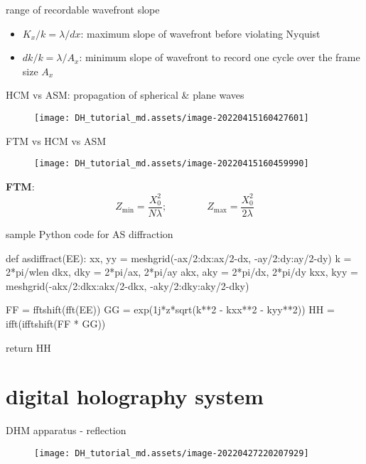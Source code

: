 \documentclass[t, aspectratio=169]{beamer}
\begin{document}
\begin{frame}{range of recordable wavefront slope}
	\begin{itemize}
		\item $K_x/k=\lambda/dx$: maximum slope of wavefront before violating Nyquist
		\item $dk/k = \lambda/A_x$: minimum slope of wavefront to record one cycle over the frame size $A_x$ 
	\end{itemize}
\end{frame}


\begin{frame}{HCM vs ASM: propagation of spherical \& plane waves}
	\begin{figure}
		\texttt{[image: DH\_tutorial\_md.assets/image-20220415160427601]}
	\end{figure}
\end{frame}


\begin{frame}{FTM vs HCM vs ASM}
	\begin{figure}
		\texttt{[image: DH\_tutorial\_md.assets/image-20220415160459990]}
	\end{figure}
	\textbf{FTM}: 
	\[ Z_{\min} = \frac{X_0^2}{N\lambda}; \qquad\qquad Z_{\max} = \frac{X_0^2}{2\lambda} \]
\end{frame}


\begin{frame}[fragile]{sample Python code for AS diffraction}
\begin{semiverbatim}
def asdiffract(EE):    
    xx, yy = meshgrid(-ax/2:dx:ax/2-dx, -ay/2:dy:ay/2-dy)
    k = 2*pi/wlen
    dkx, dky = 2*pi/ax, 2*pi/ay
    akx, aky = 2*pi/dx, 2*pi/dy
    kxx, kyy = meshgrid(-akx/2:dkx:akx/2-dkx, -aky/2:dky:aky/2-dky)
    
    FF = fftshift(fft(EE))    
    GG = exp(1j*z*sqrt(k**2 - kxx**2 - kyy**2))    
    HH = ifft(ifftshift(FF * GG))
    
    return HH    
\end{semiverbatim}
\end{frame}


\section{digital holography system}
\begin{frame}[c]
\centering\LARGE\textbf{\secname}
\end{frame}

\begin{frame}{DHM apparatus - reflection}
	\begin{figure}
		\texttt{[image: DH\_tutorial\_md.assets/image-20220427220207929]}
	\end{figure}
\end{frame}
\end{document}
